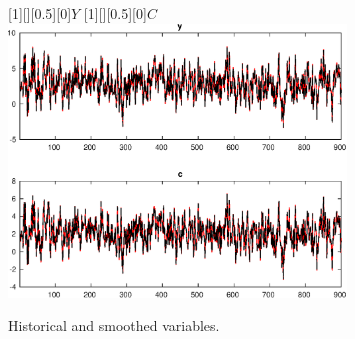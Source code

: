  
\begin{figure}[H]
[1][][0.5][0]{$ {Y} $}
[1][][0.5][0]{$ {C} $}
\centering 
\includegraphics[width=0.80\textwidth]{KimModTheBuilder_HistoricalAndSmoothedVariables1}
\caption{Historical and smoothed variables.}\label{Fig:HistoricalAndSmoothedVariables:1}
\end{figure}


